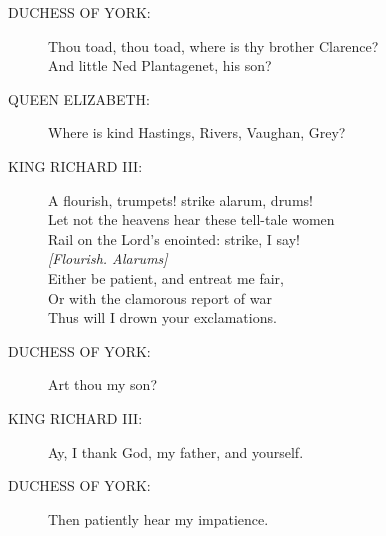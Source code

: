\documentclass{article}
\begin{document}
\begin{description}
\item[DUCHESS OF YORK:] 
\hspace{1pt}Thou toad, thou toad, where is thy brother Clarence?\\
\hspace{1pt}And little Ned Plantagenet, his son?\\
\end{description}
\begin{description}
\item[QUEEN ELIZABETH:] 
\hspace{1pt}Where is kind Hastings, Rivers, Vaughan, Grey?\\
\end{description}
\begin{description}
\item[KING RICHARD III:] 
\hspace{1pt}A flourish, trumpets! strike alarum, drums!\\
\hspace{1pt}Let not the heavens hear these tell-tale women\\
\hspace{1pt}Rail on the Lord's enointed: strike, I say!\\
{\it [Flourish. Alarums]}\\
\hspace{1pt}Either be patient, and entreat me fair,\\
\hspace{1pt}Or with the clamorous report of war\\
\hspace{1pt}Thus will I drown your exclamations.\\
\end{description}
\begin{description}
\item[DUCHESS OF YORK:] 
\hspace{1pt}Art thou my son?\\
\end{description}
\begin{description}
\item[KING RICHARD III:] 
\hspace{1pt}Ay, I thank God, my father, and yourself.\\
\end{description}
\begin{description}
\item[DUCHESS OF YORK:] 
\hspace{1pt}Then patiently hear my impatience.\\
\end{description}
\end{document}
